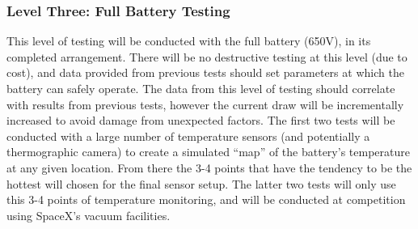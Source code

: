\documentclass[main.tex]{subfiles}
\begin{document}
    \subsubsection{Level Three: Full Battery Testing}
    This level of testing will be conducted with the full battery (650V), in its completed arrangement. There will be no destructive testing at this level (due to cost), and data provided from previous tests should set parameters at which the battery can safely operate. The data from this level of testing should correlate with results from previous tests, however the current draw will be incrementally increased to avoid damage from unexpected factors. The first two tests will be conducted with a large number of temperature sensors (and potentially a thermographic camera) to create a simulated “map” of the battery’s temperature at any given location. From there the 3-4 points that have the tendency to be the hottest will chosen for the final sensor setup. The latter two tests will only use this 3-4 points of temperature monitoring, and will be conducted at competition using SpaceX’s vacuum facilities.
\end{document}
